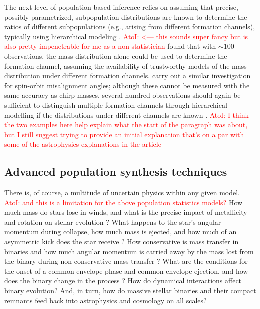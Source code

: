 \documentclass[iop,onecolumn]{revtex4}
\newcommand{\ajf}[1]{\textcolor{red}{AtoI: #1}}
\begin{document}
The next level of population-based inference relies on assuming that precise, possibly parametrized, subpopulation distributions are known to determine the ratios of different subpopulations (e.g., arising from different formation channels), typically using hierarchical modeling \citep[extreme deconvolution in the language of][]{Hogg:2010}. \ajf{<--- this sounds super fancy but is also pretty impenetrable for me as a non-statistician} \citet{Zevin:2017} found that with $\sim 100$ observations, the mass distribution alone could be used to determine the formation channel, assuming the availability of trustworthy models of the mass distribution under different formation channels.  \citet{Vitale:2015,Stevenson:2017spin} carry out a similar investigation for spin-orbit misalignment angles; although these cannot be measured with the same accuracy as chirp masses, several hundred observations should again be sufficient to distinguish multiple formation channels through hierarchical modelling if the distributions under different channels are known \citep{Stevenson:2017spin}.  \ajf{I think the two examples here help explain what the start of the paragraph was about, but I still suggest trying to provide an initial explanation that's on a par with some of the astrophysics explanations in the article}

\subsection{Advanced population synthesis techniques}
There is, of course, a multitude of uncertain physics within any given model. \ajf{and this is a limitation for the above population statistics models?} How much mass do stars lose in winds, and what is the precise impact of metallicity and rotation on stellar evolution \citep[e.g.,][]{Renzo:2017}?  What happens to the star's angular momentum during collapse, how much mass is ejected, and how much of an asymmetric kick does the star receive \citep[e.g.,][]{Mirabel:2016}? How conservative is mass transfer in binaries and how much angular momentum is carried away by the mass lost from the binary during non-conservative mass transfer \citep[e.g.,][]{vandenHeuvel:2017}?  What are the conditions for the onset of a common-envelope phase and common envelope ejection, and how does the binary change in the process \citep[e.g.,][]{Ivanova:2013}?   How do dynamical interactions affect binary evolution?  And, in turn, how do massive stellar binaries and their compact remnants feed back into astrophysics and cosmology on all scales?
\end{document}
